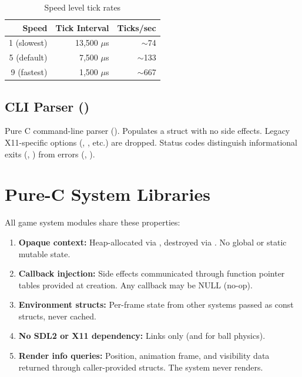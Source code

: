 \documentclass[11pt,a4paper]{article}
\begin{document}
\begin{table}[h]
\centering
\caption{Speed level tick rates}
\label{tab:speed-levels}
\begin{tabular}{rrr}
\toprule
\textbf{Speed} & \textbf{Tick Interval} & \textbf{Ticks/sec} \\
\midrule
1 (slowest) & 13{,}500 $\mu$s & $\sim$74 \\
5 (default) & 7{,}500 $\mu$s & $\sim$133 \\
9 (fastest) & 1{,}500 $\mu$s & $\sim$667 \\
\bottomrule
\end{tabular}
\end{table}

\subsection{CLI Parser ()}
\label{sec:cli}

Pure C command-line parser (). Populates a  struct with no side effects. Legacy X11-specific options (, , etc.) are dropped. Status codes distinguish informational exits (, ) from errors (, ).


\section{Pure-C System Libraries}
\label{sec:systems}

All game system modules share these properties:
\begin{enumerate}[nosep]
    \item \textbf{Opaque context:} Heap-allocated via , destroyed via . No global or static mutable state.
    \item \textbf{Callback injection:} Side effects communicated through function pointer tables provided at creation. Any callback may be NULL (no-op).
    \item \textbf{Environment structs:} Per-frame state from other systems passed as const structs, never cached.
    \item \textbf{No SDL2 or X11 dependency:} Links only  (and  for ball physics).
    \item \textbf{Render info queries:} Position, animation frame, and visibility data returned through caller-provided structs. The system never renders.
\end{enumerate}
\end{document}
